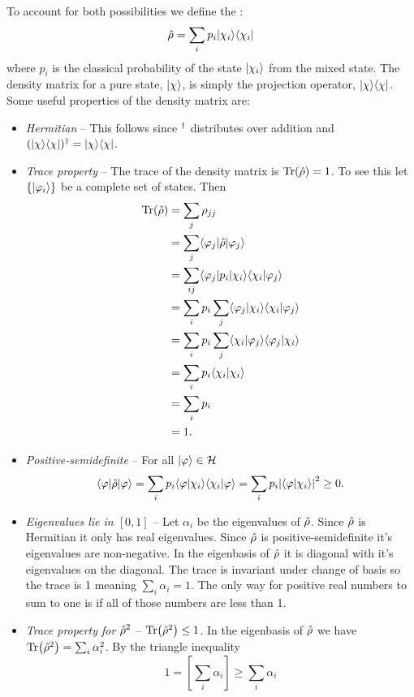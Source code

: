     To account for both possibilities we define the :
    \[\hat{\rho} = \sum_i p_i\vert {\chi_i}\rangle\langle {\chi_i} \vert\]
    where \(p_i\) is the classical probability of the state \(\vert {\chi_i} \rangle\) from the mixed state.
    The density matrix for a pure state, \(\vert {\chi} \rangle\), is simply the projection operator, \(\vert {\chi}\rangle\langle {\chi} \vert\).
    Some useful properties of the density matrix are:
    \begin{itemize}
        \item \emph{Hermitian} -- This follows since \(^\dagger\) distributes over addition and \((\vert {\chi}\rangle\langle {\chi} \vert)^\dagger = \vert {\chi}\rangle\langle {\chi} \vert\).
        
        \item \emph{Trace property} -- The trace of the density matrix is \(\Tr(\hat{\rho}) = 1\).
        To see this let \(\{\vert {\varphi_i} \rangle\}\) be a complete set of states.
        Then
        \begin{align*}
            \Tr(\hat{\rho}) &= \sum_{j} \rho_{jj}\\
            &= \sum_{j} \langle {\varphi_j} \vert\hat{\rho}\vert {\varphi_j} \rangle\\
            &= \sum_{ij} \langle {\varphi_j} \vert p_i\vert {\chi_i} \rangle \langle {\chi_i} \vert {\varphi_j} \rangle\\
            &= \sum_i p_i \sum_j \langle {\varphi_j} \vert {\chi_i} \rangle \langle {\chi_i} \vert {\varphi_j} \rangle\\
            &= \sum_i p_i \sum_j \langle {\chi_i} \vert {\varphi_j} \rangle \langle {\varphi_j} \vert {\chi_i} \rangle\\
            &= \sum_i p_i \langle {\chi_i} \vert {\chi_i} \rangle\\
            &= \sum_i p_i\\
            &= 1.
        \end{align*}
        
        \item \emph{Positive-semidefinite} -- For all \(\vert {\varphi} \rangle\in\mathcal{H}\)
        \[\langle {\varphi} \vert\hat{\rho}\vert {\varphi} \rangle = \sum_i p_i \langle {\varphi} \vert {\chi_i} \rangle\langle {\chi_i} \vert {\varphi} \rangle = \sum_i p_i \abs{\langle {\varphi} \vert {\chi_i} \rangle}^2 \ge 0.\]
        
        \item \emph{Eigenvalues lie in \([0, 1]\)} -- Let \(\alpha_i\) be the eigenvalues of \(\hat{\rho}\).
        Since \(\hat{\rho}\) is Hermitian it only has real eigenvalues.
        Since \(\hat{\rho}\) is positive-semidefinite it's eigenvalues are non-negative.
        In the eigenbasis of \(\hat{\rho}\) it is diagonal with it's eigenvalues on the diagonal.
        The trace is invariant under change of basis so the trace is 1 meaning \(\sum_i \alpha_i = 1\).
        The only way for positive real numbers to sum to one is if all of those numbers are less than 1.
        
        \item \emph{Trace property for \(\hat{\rho}^2\)} -- \(\Tr(\hat{\rho}^2) \le 1\).
        In the eigenbasis of \(\hat{\rho}\) we have \(\Tr(\hat{\rho}^2) = \sum_i\alpha_i^2\).
        By the triangle inequality
        \[1 = \left[\sum_i \alpha_i\right] \ge \sum_i \alpha_i\]
    \end{itemize}
